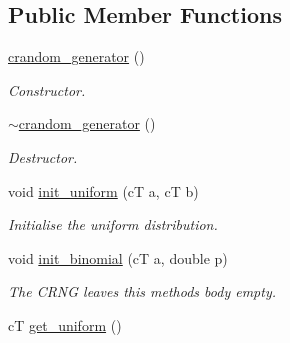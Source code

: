 \subsection*{Public Member Functions}
\begin{DoxyCompactItemize}
\item 
\mbox{\label{classlgraph_1_1utils_1_1crandom__generator_a90bfc340dcb2fa15e744cff6e280978a}} 
\hyperlink{classlgraph_1_1utils_1_1crandom__generator_a90bfc340dcb2fa15e744cff6e280978a}{crandom\+\_\+generator} ()
\begin{DoxyCompactList}\small\item\em Constructor. \end{DoxyCompactList}\item 
\mbox{\label{classlgraph_1_1utils_1_1crandom__generator_ade03d6aba0a68ba5b34582cf8107b7aa}} 
\hyperlink{classlgraph_1_1utils_1_1crandom__generator_ade03d6aba0a68ba5b34582cf8107b7aa}{$\sim$crandom\+\_\+generator} ()
\begin{DoxyCompactList}\small\item\em Destructor. \end{DoxyCompactList}\item 
void \hyperlink{classlgraph_1_1utils_1_1crandom__generator_addfa5951276296b2a164e5dc482728ce}{init\+\_\+uniform} (cT a, cT b)
\begin{DoxyCompactList}\small\item\em Initialise the uniform distribution. \end{DoxyCompactList}\item 
\mbox{\label{classlgraph_1_1utils_1_1crandom__generator_a4d7042cb0862c3b8b4792890e6c5388c}} 
void \hyperlink{classlgraph_1_1utils_1_1crandom__generator_a4d7042cb0862c3b8b4792890e6c5388c}{init\+\_\+binomial} (cT a, double p)
\begin{DoxyCompactList}\small\item\em The C\+R\+NG leaves this method\textquotesingle{}s body empty. \end{DoxyCompactList}\item 
\mbox{\label{classlgraph_1_1utils_1_1crandom__generator_a39dd7f9d80fd5be685cc240719050119}} 
cT \hyperlink{classlgraph_1_1utils_1_1crandom__generator_a39dd7f9d80fd5be685cc240719050119}{get\+\_\+uniform} ()

\end{DoxyCompactItemize}
